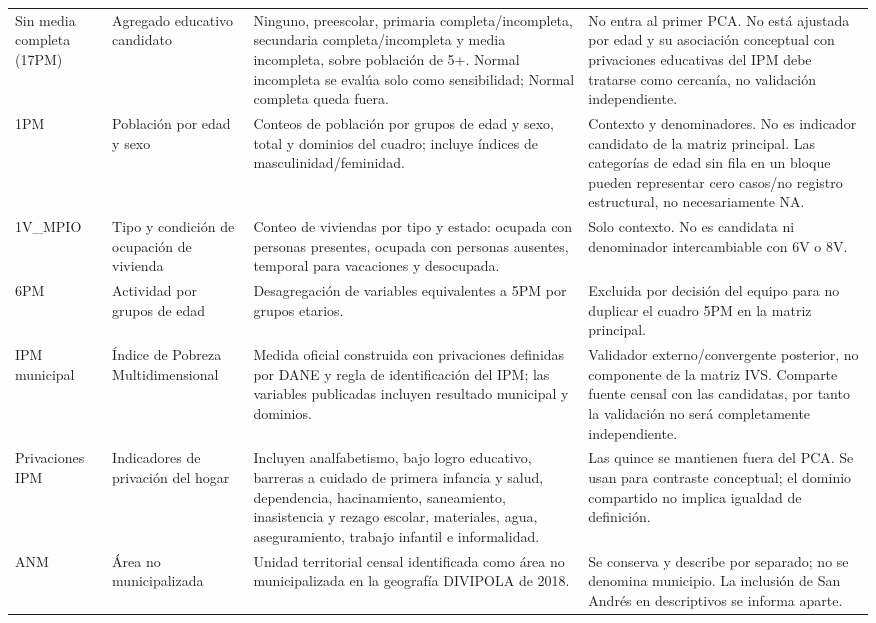 \begin{singlespace}
\begin{longtable}{@{}p{}p{}p{}p{}@{}}
Sin media completa (17PM) & Agregado educativo candidato & Ninguno, preescolar, primaria completa/incompleta, secundaria completa/incompleta y media incompleta, sobre población de 5+. Normal incompleta se evalúa solo como sensibilidad; Normal completa queda fuera. & No entra al primer PCA. No está ajustada por edad y su asociación conceptual con privaciones educativas del IPM debe tratarse como cercanía, no validación independiente.\\
1PM & Población por edad y sexo & Conteos de población por grupos de edad y sexo, total y dominios del cuadro; incluye índices de masculinidad/feminidad. & Contexto y denominadores. No es indicador candidato de la matriz principal. Las categorías de edad sin fila en un bloque pueden representar cero casos/no registro estructural, no necesariamente NA.\\
1V\_MPIO & Tipo y condición de ocupación de vivienda & Conteo de viviendas por tipo y estado: ocupada con personas presentes, ocupada con personas ausentes, temporal para vacaciones y desocupada. & Solo contexto. No es candidata ni denominador intercambiable con 6V o 8V.\\
6PM & Actividad por grupos de edad & Desagregación de variables equivalentes a 5PM por grupos etarios. & Excluida por decisión del equipo para no duplicar el cuadro 5PM en la matriz principal.\\
IPM municipal & Índice de Pobreza Multidimensional & Medida oficial construida con privaciones definidas por DANE y regla de identificación del IPM; las variables publicadas incluyen resultado municipal y dominios. & Validador externo/convergente posterior, no componente de la matriz IVS. Comparte fuente censal con las candidatas, por tanto la validación no será completamente independiente.\\
Privaciones IPM & Indicadores de privación del hogar & Incluyen analfabetismo, bajo logro educativo, barreras a cuidado de primera infancia y salud, dependencia, hacinamiento, saneamiento, inasistencia y rezago escolar, materiales, agua, aseguramiento, trabajo infantil e informalidad. & Las quince se mantienen fuera del PCA. Se usan para contraste conceptual; el dominio compartido no implica igualdad de definición.\\
ANM & Área no municipalizada & Unidad territorial censal identificada como área no municipalizada en la geografía DIVIPOLA de 2018. & Se conserva y describe por separado; no se denomina municipio. La inclusión de San Andrés en descriptivos se informa aparte.\\
\bottomrule
\end{longtable}
\normalsize
\end{singlespace}

